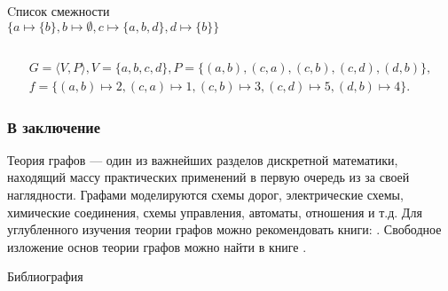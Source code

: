 \begin{frame}
\begin{columns}
            \begin{block}{Cписок смежности}
                \[
                    \{a\mapsto\{b\},b\mapsto\emptyset,
                    c\mapsto\{a,b,d\},d\mapsto\{b\}\}
                \]
            \end{block}
    \end{columns}
    \[
        \begin{split}
            G=\langle V,P\rangle,V=\{a,b,c,d\}, P=\{(a,b),(c,a),(c,b),(c,d),(d,b)\},\\
            f=\{(a,b)\mapsto 2,(c,a)\mapsto 1,(c,b)\mapsto 3,(c,d)\mapsto 5,(d,b)\mapsto 4\}.
        \end{split}
    \]
\end{frame}


\appendix

\begin{frame}
    \frametitle{В заключение}
    Теория графов --- один из важнейших разделов дискретной математики, находящий массу практических применений в первую очередь из за своей наглядности. Графами моделируются схемы дорог, электрические схемы, химические соединения, схемы управления, автоматы, отношения и т.д. Для углубленного изучения теории графов можно рекомендовать книги: \cite{bib:shaporev:discretemath, bib:gorbatovs:discrmath, bib:novic:discrmathprogrammer}. Свободное изложение основ теории графов можно найти в книге \cite{bib:ore:graphs}.
\end{frame}


\begin{frame}[allowframebreaks]{Библиография}
    
    
\end{frame}

